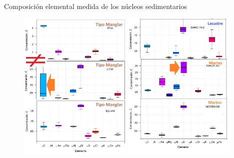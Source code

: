 \documentclass[9pt]{beamer}
\begin{document}
\begin{frame}{Composición elemental medida de los núcleos sedimentarios}
	\begin{figure}
		\centering
		\includegraphics[width=0.48\textwidth]{Imagenes/XRF_Todos_Los_Nucleos_1-2.png}
		\includegraphics[width=0.48\textwidth]{Imagenes/XRF_Todos_Los_Nucleos_2-2.png}
	\end{figure}
\end{frame}
\end{document}
